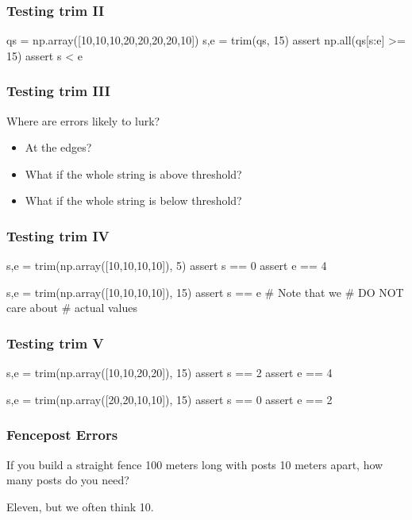 \begin{frame}[fragile]
\frametitle{Testing trim II}
\begin{python}

qs = np.array([10,10,10,20,20,20,20,10])
s,e = trim(qs, 15)
assert np.all(qs[s:e] >= 15)
assert s < e
\end{python}
\end{frame}

\begin{frame}[fragile]
\frametitle{Testing trim III}

Where are errors likely to lurk?
\pause

\begin{itemize}
\item At the edges?
\item What if the whole string is \alert{above} threshold?
\item What if the whole string is \alert{below} threshold?
\end{itemize}

\end{frame}

\begin{frame}[fragile]
\frametitle{Testing trim IV}
\begin{python}

s,e = trim(np.array([10,10,10,10]), 5)
assert s == 0
assert e == 4

s,e = trim(np.array([10,10,10,10]), 15)
assert s == e # Note that we 
              # DO NOT care about
              # actual values

\end{python}
\end{frame}

\begin{frame}[fragile]
\frametitle{Testing trim V}
\begin{python}

s,e = trim(np.array([10,10,20,20]), 15)
assert s == 2
assert e == 4

s,e = trim(np.array([20,20,10,10]), 15)
assert s == 0
assert e == 2
\end{python}
\end{frame}

\begin{frame}[fragile]
\frametitle{Fencepost Errors}

If you build a straight fence 100 meters long with posts 10 meters apart, how
many posts do you need?

\pause

\bigskip
\bigskip

Eleven, but we often think 10.

\end{frame}

